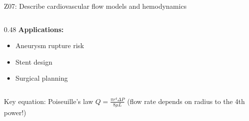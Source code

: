 \documentclass[aspectratio=169, 10pt]{beamer}
\begin{document}
\begin{frame}{Z07: Describe cardiovascular flow models and hemodynamics}
\begin{columns}[T]
\begin{column}{0.48\textwidth}
            \vspace{0.2cm}
            \textbf{Applications:}
            \begin{itemize}
                \item Aneurysm rupture risk
                \item Stent design
                \item Surgical planning
            \end{itemize}
        \end{column}
    \end{columns}
    
    \vspace{0.2cm}
    \begin{block}{Key equation: Poiseuille's law}
        $Q = \frac{\pi r^4 \Delta P}{8 \mu L}$ \quad (flow rate depends on radius to the 4th power!)
    \end{block}
\end{frame}
\end{document}

